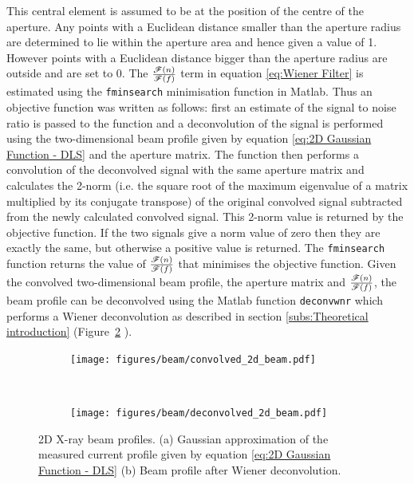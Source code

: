 This central element is assumed to be at the position of the centre of the aperture.
Any points with a Euclidean distance smaller than the aperture radius are determined to lie within the aperture area and hence given a value of 1.
However points with a Euclidean distance bigger than the aperture radius are outside and are set to 0.
\newline
The $\frac{\mathscr{F}(n)}{\mathscr{F}(f)}$ term in equation \ref{eq:Wiener Filter} is estimated using the \verb+fminsearch+ minimisation function in Matlab.
Thus an objective function was written as follows: first an estimate of the signal to noise ratio is passed to the function and a deconvolution of the signal is performed using the two-dimensional beam profile given by equation \ref{eq:2D Gaussian Function - DLS} and the aperture matrix.
The function then performs a convolution of the deconvolved signal with the same aperture matrix and calculates the 2-norm (i.e. the square root of the maximum eigenvalue of a matrix multiplied by its conjugate transpose) of the original convolved signal subtracted from the newly calculated convolved signal.
This 2-norm value is returned by the objective function.
If the two signals give a norm value of zero then they are exactly the same, but otherwise a positive value is returned.
The \verb+fminsearch+ function returns the value of $\frac{\mathscr{F}(n)}{\mathscr{F}(f)}$ that minimises the objective function.
Given the convolved two-dimensional beam profile, the aperture matrix and $\frac{\mathscr{F}(n)}{\mathscr{F}(f)}$, the beam profile can be deconvolved using the Matlab function \verb+deconvwnr+ which performs a Wiener deconvolution as described in section \ref{subs:Theoretical introduction} (Figure~\ref{fig:Deconvolved 2D beam profile - DLS} ).
\begin{figure}
        \centering
        \begin{subfigure}[b]{1.0\textwidth}
                \centering
                \texttt{[image: figures/beam/convolved\_2d\_beam.pdf]}
                \caption{}
                \label{fig:Gaussian approximation of convolved Beam profile - DLS}
        \end{subfigure}
				\\
        \begin{subfigure}[b]{1.0\textwidth}
                \centering
                \texttt{[image: figures/beam/deconvolved\_2d\_beam.pdf]}
                \caption{}
                \label{fig:Deconvolved 2D beam profile - DLS}
        \end{subfigure}
        \caption[2D X-ray beam profile reconstructions.]{2D X-ray beam profiles.
        (a) Gaussian approximation of the measured current profile given by equation \ref{eq:2D Gaussian Function - DLS}
        (b) Beam profile after Wiener deconvolution.}
        \label{fig:2D relative X-ray beam profiles, convolved and deconvolved}
\end{figure}

